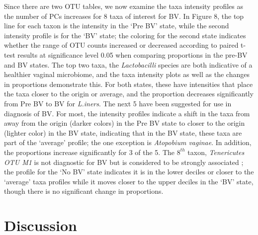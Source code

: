 \documentclass[doublespacing]{bmcart}
\def\texttt{[image: ]}
\begin{document}
Since there are two OTU tables, we now examine the taxa intensity profiles as the number of PCs increases for 8 taxa of interest for BV.  In Figure 8, the top line for each taxon is the intensity in the `Pre BV' state, while the second intensity profile is for the `BV' state; the coloring for the second state indicates whether the range of OTU counts increased or decreased according to paired t-test results at significance level 0.05 when comparing proportions in the pre-BV and BV states.  The top two taxa, the \textit{Lactobacilli} species are both indicative of a healthier vaginal microbiome, and the taxa intensity plots as well as the changes in proportions demonstrate this. For both states, these have intensities that place the taxa closer to the origin or average, and the proportion decreases significantly from Pre BV to BV for \textit{L.iners}. The next 5 have been suggested for use in diagnosis of BV. For most, the intensity profiles indicate a shift in the taxa from away from the origin (darker colors) in the Pre BV state to closer to the origin (lighter color) in the BV state, indicating that in the BV state, these taxa are part of the `average' profile; the one exception is \textit{Atopobium vaginae}.  In addition, the proportions increase significantly for 3 of the 5.  The $8^{th}$ taxon, \textit{Tenericutes OTU M1} is not diagnostic for BV but is considered to be strongly associated \cite{fettweis2014differences}; the profile for the `No BV' state indicates it is in the lower deciles or closer to the `average' taxa profiles while it moves closer to the upper deciles in the `BV' state, though there is no significant change in proportions.



\section*{Discussion}
\end{document}
